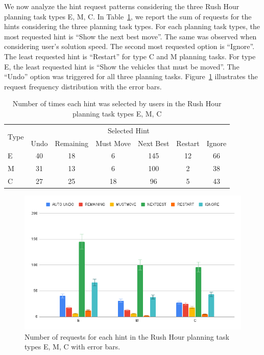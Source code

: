 We now analyze the hint request patterns considering the three Rush Hour planning task types E, M, C.
In Table~\ref{tab:groupsandrequests}, we report the sum of requests for the hints considering the three planning task types.
For each planning task types, the most requested hint is ``Show the next best move''.
The same was observed when considering user's solution speed.
The second most requested option is ``Ignore''.
The least requested hint is ``Restart'' for type C and M planning tasks.
For type E, the least requested hint is ``Show the vehicles that must be moved''.
The ``Undo'' option was triggered for all three planning tasks.
Figure~\ref{fig:groupandrequest} illustrates the request frequency distribution with the error bars.
\begin{table}[tpb]
\caption{Number of times each hint was selected by users in the Rush Hour planning task types E, M, C}
\begin{tabular}{|l|cccccc|}
\hline
\multirow{2}{*}{Type} & \multicolumn{6}{c|}{Selected Hint} \\ \cline{2-7} 
 & \multicolumn{1}{c|}{Undo} & \multicolumn{1}{c|}{Remaining} & \multicolumn{1}{c|}{Must Move} & \multicolumn{1}{c|}{Next Best} & \multicolumn{1}{c|}{Restart} & Ignore \\ \hline
E & 40 & 18 & 6 & 145 & 12 & 66 \\ \hline
M & 31 & 13 & 6 & 100 & 2 & 38 \\ \hline
C & 27 & 25 & 18 & 96 & 5 & 43 \\ \hline
\end{tabular}
\label{tab:groupsandrequests}
\end{table}

\begin{figure}[tpb]
  \centering
\includegraphics[width=0.8\columnwidth]{img/typeandreq.png}
  \caption{Number of requests for each hint in the Rush Hour planning task types E, M, C with error bars.}
  \label{fig:groupandrequest}
\end{figure}

